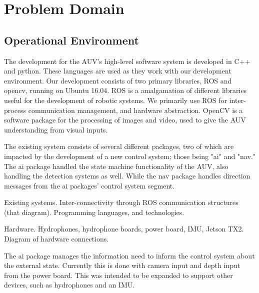 \chapter{Problem Domain}

\label{Chapter2}

\section{Operational Environment}

The development for the AUV's high-level software system is developed in C++ and
python. These languages are used as they work with our development environment.
Our development consists of two primary libraries, \gls{ROS} and \gls{opencv},
running on Ubuntu 16.04. ROS is a amalgamation of different libraries useful for
the development of robotic systems. We primarily use ROS for inter-process
communication management, and hardware abstraction. OpenCV is a software package
for the processing of images and video, used to give the AUV understanding from visual inputs.

The existing system consists of several different packages, two of which are
impacted by the development of a new control system; those being "ai" and "nav."
The ai package handled the state machine functionality of the AUV, also handling
the detection systems as well. While the nav package handles direction messages
from the ai packages' control system segment.

Existing systems.
Inter-connectivity through ROS communication structures (that diagram).
Programming languages, and technologies.

Hardware.
Hydrophones, hydrophone boards, power board, IMU, Jetson TX2.
Diagram of hardware connections.

The ai package manages the information need to inform the control system about
the external state. Currently this is done with camera input and depth input
from the power board. This was intended to be expanded to support other devices,
such as hydrophones and an \gls{IMU}.
